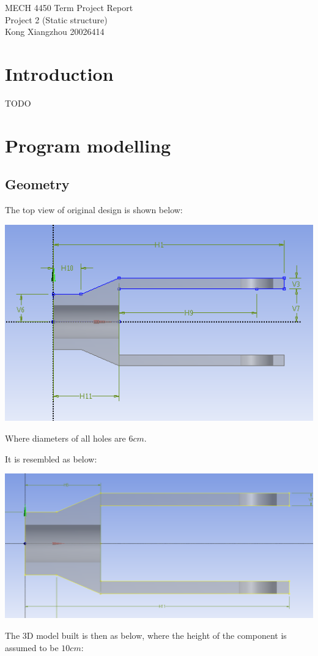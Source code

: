 \documentclass[a4paper,14pt]{extarticle}
\begin{document}
\begin{center}
\LARGE{MECH 4450 Term Project Report}\\\vspace{1em}
\Large{Project 2 (Static structure)}\\\vspace{1em}
\Large{Kong Xiangzhou 20026414}\\\vspace{1em}
\end{center}
\section{Introduction}
TODO
\section{Program modelling}
\subsection{Geometry}
The top view of original design is shown below:

\includegraphics[width=\textwidth]{2D_ORIGIN.png}

Where diameters of all holes are $6cm$.

It is resembled as below:

\includegraphics[width=\textwidth]{2D_S_01.PNG}

The 3D model built is then as below, where the height of the component is assumed to be $10 cm$:
\end{document}
